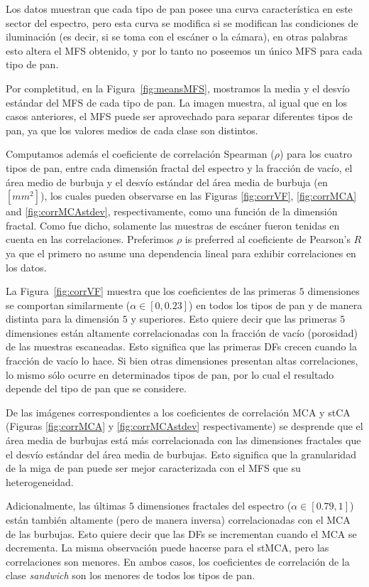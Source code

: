 \documentclass[spanish,a4paper,openright,11pt]{book}
\begin{document}
Los datos muestran que cada tipo de pan posee una curva característica en este sector del espectro, pero esta curva se modifica si se modifican las condiciones de iluminación (es decir, si se toma con el escáner o la cámara), en otras palabras esto altera el MFS obtenido, y por lo tanto no poseemos un único MFS para cada tipo de pan. 

Por completitud, en la Figura~\ref{fig:meansMFS}, mostramos la media y el desvío estándar del MFS de cada tipo de pan. La imagen muestra, al igual que en los casos anteriores, el MFS puede ser aprovechado para separar diferentes tipos de pan, ya que los valores medios de cada clase son distintos.

Computamos además el coeficiente de correlación Spearman ($\rho$) para los cuatro tipos de pan, entre cada dimensión fractal del espectro y la fracción de vacío, el área medio de burbuja y el desvío estándar del área media de burbuja (en $[mm^{2}]$), los cuales pueden observarse en las Figuras \ref{fig:corrVF}, \ref{fig:corrMCA} and \ref{fig:corrMCAstdev}, respectivamente, como una función de la dimensión fractal. Como fue dicho, solamente las muestras de escáner fueron tenidas en cuenta en las correlaciones. Preferimos $\rho$ is preferred al coeficiente de Pearson's $R$ ya que el primero no asume una dependencia lineal para exhibir correlaciones en los datos.

La Figura~\ref{fig:corrVF} muestra que los coeficientes de las primeras $5$ dimensiones se comportan similarmente ($\alpha \in [0,0.23]$) en todos los tipos de pan y de manera distinta para la dimensión $5$ y superiores. Esto quiere decir que las primeras $5$ dimensiones están altamente correlacionadas con la fracción de vacío (porosidad) de las muestras escaneadas. Esto significa que las primeras DFs crecen cuando la fracción de vacío lo hace. Si bien otras dimensiones presentan altas correlaciones, lo mismo sólo ocurre en determinados tipos de pan, por lo cual el resultado depende del tipo de pan que se considere.

De las imágenes correspondientes a los coeficientes de correlación MCA y stCA (Figuras \ref{fig:corrMCA} y \ref{fig:corrMCAstdev} respectivamente) se desprende que el área media de burbujas está más correlacionada con las dimensiones fractales que el desvío estándar del área media de burbujas. Esto significa que la granularidad de la miga de pan puede ser mejor caracterizada con el MFS que su heterogeneidad.

Adicionalmente, las últimas $5$ dimensiones fractales  del espectro ($\alpha \in [0.79,1]$) están también altamente (pero de manera inversa) correlacionadas con el MCA de las burbujas. Esto quiere decir que las DFs se incrementan cuando el MCA se decrementa. La misma observación puede hacerse para el stMCA, pero las correlaciones son menores. En ambos casos, los coeficientes de correlación de la clase {\em sandwich} son los menores de todos los tipos de pan.
\end{document}
